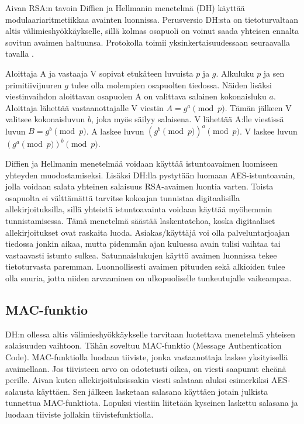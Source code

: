 \documentclass[finnish]{tktltiki2}
\theoremstyle{definition}
\theoremstyle{remark}
\begin{document}
Aivan RSA:n tavoin Diffien ja Hellmanin menetelmä (DH) käyttää modulaariaritmetiikkaa avainten luonnissa. Perusversio DH:sta on tietoturvaltaan altis välimieshyökkäykselle, sillä kolmas osapuoli on voinut saada yhteisen ennalta sovitun avaimen haltuunsa. Protokolla toimii yksinkertaisuudessaan seuraavalla tavalla \cite{math2}.

Aloittaja A ja vastaaja V sopivat etukäteen luvuista $p$ ja $g$. Alkuluku  $p$ ja sen primitiivijuuren $g$ tulee olla molempien osapuolten tiedossa. Näiden lisäksi viestinvaihdon aloittavan osapuolen A on valittava salainen kokonaisluku $a$. Aloittaja lähettää vastaanottajalle V viestin $A = g^a \pmod{p}$. Tämän jälkeen V valitsee kokonaisluvun $b$, joka myös säilyy salaisena. V lähettää A:lle viestissä luvun $B = g^b \pmod{p}$. A laskee luvun $(g^b \pmod{p})^a \pmod{p}$. V laskee luvun $(g^a \pmod{p})^b \pmod{p}$.

Diffien ja Hellmanin menetelmää voidaan käyttää istuntoavaimen luomiseen yhteyden muodostamiseksi. Lisäksi DH:lla pystytään luomaan AES-istuntoavain, jolla voidaan salata yhteinen salaisuus RSA-avaimen luontia varten. Toista osapuolta ei välttämättä tarvitse kokoajan tunnistaa digitaalisilla allekirjoituksilla, sillä yhteistä istuntoavainta voidaan käyttää myöhemmin tunnistamisessa. Tämä menetelmä säästää laskentatehoa, koska digitaaliset allekirjoitukset ovat raskaita luoda. Asiakas/käyttäjä voi olla palveluntarjoajan tiedossa jonkin aikaa, mutta pidemmän ajan kuluessa avain tulisi vaihtaa tai vastaavasti istunto sulkea. Satunnaislukujen käyttö avaimen luonnissa tekee tietoturvasta paremman. Luonnollisesti avaimen pituuden sekä alkioiden tulee olla suuria, jotta niiden arvaaminen on ulkopuoliselle tunkeutujalle vaikeampaa. \cite{enti}

\subsection{MAC-funktio}

DH:n ollessa altis välimieshyökkäykselle tarvitaan luotettava menetelmä yhteisen salaisuuden vaihtoon. Tähän soveltuu MAC-funktio (Message Authentication Code). MAC-funktiolla luodaan tiiviste, jonka vastaanottaja laskee yksityisellä avaimellaan. Jos tiivisteen arvo on odotetusti oikea, on viesti saapunut eheänä perille. Aivan kuten allekirjoituksissakin viesti salataan aluksi esimerkiksi AES-salausta käyttäen. Sen jälkeen lasketaan salasana käyttäen jotain julkista tunnettua MAC-funktiota. Lopuksi viestiin liitetään kyseinen laskettu salasana ja luodaan tiiviste jollakin tiivistefunktiolla.
\end{document}
